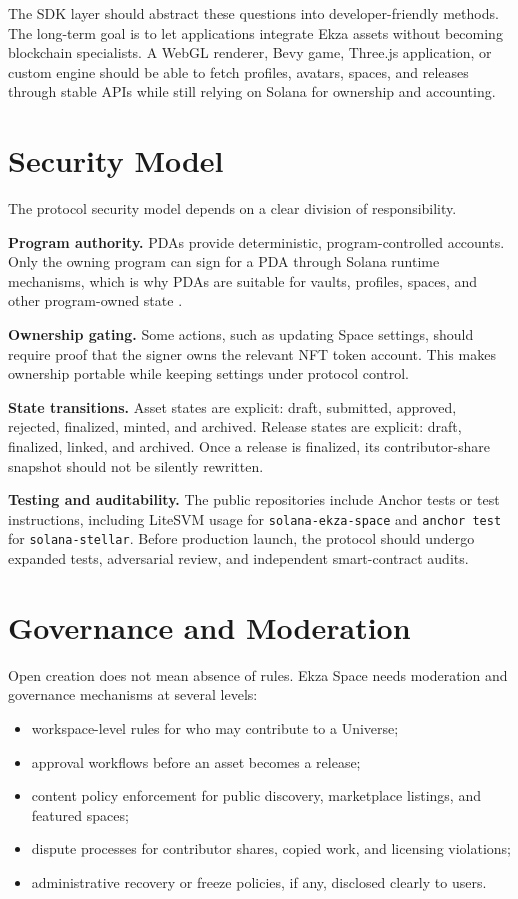 \documentclass[10pt,twocolumn]{article}
\newcommand{\protocol}[1]{\texttt{#1}}
\begin{document}
The SDK layer should abstract these questions into developer-friendly methods. The long-term goal is to let applications integrate Ekza assets without becoming blockchain specialists. A WebGL renderer, Bevy game, Three.js application, or custom engine should be able to fetch profiles, avatars, spaces, and releases through stable APIs while still relying on Solana for ownership and accounting.

\section{Security Model}
The protocol security model depends on a clear division of responsibility.

\textbf{Program authority.} PDAs provide deterministic, program-controlled accounts. Only the owning program can sign for a PDA through Solana runtime mechanisms, which is why PDAs are suitable for vaults, profiles, spaces, and other program-owned state \cite{solana_pda_accounts}.

\textbf{Ownership gating.} Some actions, such as updating Space settings, should require proof that the signer owns the relevant NFT token account. This makes ownership portable while keeping settings under protocol control.

\textbf{State transitions.} Asset states are explicit: draft, submitted, approved, rejected, finalized, minted, and archived. Release states are explicit: draft, finalized, linked, and archived. Once a release is finalized, its contributor-share snapshot should not be silently rewritten.

\textbf{Testing and auditability.} The public repositories include Anchor tests or test instructions, including LiteSVM usage for \protocol{solana-ekza-space} and \protocol{anchor test} for \protocol{solana-stellar}. Before production launch, the protocol should undergo expanded tests, adversarial review, and independent smart-contract audits.

\section{Governance and Moderation}
Open creation does not mean absence of rules. Ekza Space needs moderation and governance mechanisms at several levels:
\begin{itemize}
    \item workspace-level rules for who may contribute to a Universe;
    \item approval workflows before an asset becomes a release;
    \item content policy enforcement for public discovery, marketplace listings, and featured spaces;
    \item dispute processes for contributor shares, copied work, and licensing violations;
    \item administrative recovery or freeze policies, if any, disclosed clearly to users.
\end{itemize}
\end{document}
